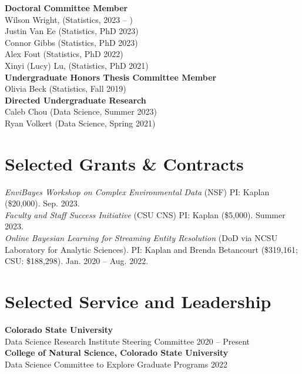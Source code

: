 \documentclass[margin,line]{res}
\begin{document}
\begin{resume}
{\bf Doctoral Committee Member} \hfill \\
Wilson Wright, (Statistics, 2023 -- )\\
Justin Van Ee (Statistics, PhD 2023) \\
Connor Gibbs (Statistics, PhD 2023)  \\
Alex Fout (Statistics, PhD 2022) \\
Xinyi (Lucy) Lu, (Statistics, PhD 2021) \\

\vspace{-.6cm}
{\bf Undergraduate Honors Thesis Committee Member} \hfill \\
Olivia Beck (Statistics, Fall 2019) \\

\vspace{-.6cm}
{\bf Directed Undergraduate Research} \hfill \\
Caleb Chou (Data Science, Summer 2023) \\
Ryan Volkert (Data Science, Spring 2021)

\section{\sc Selected Grants \& Contracts}

{\em EnviBayes Workshop on Complex Environmental Data} (NSF) PI: Kaplan (\$20,000). Sep. 2023. \\
{\em Faculty and Staff Success Initiative} (CSU CNS) PI: Kaplan (\$5,000). Summer 2023. \\
{\em Online Bayesian Learning for Streaming Entity Resolution} (DoD via NCSU Laboratory for Analytic Sciences). PI: Kaplan and Brenda Betancourt (\$319,161; CSU: \$188,298). Jan. 2020 -- Aug. 2022. 


\section{\sc Selected Service and Leadership}

{\bf Colorado State University} \\
Data Science Research Institute Steering Committee \hfill {2020 -- Present} \\

\vspace{-.3cm}
{\bf College of Natural Science, Colorado State University} \\
Data Science Committee to Explore Graduate Programs \hfill {2022} \\


\end{resume}
\end{document}

